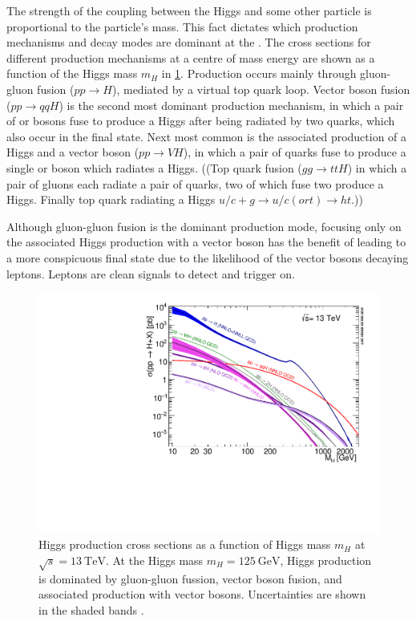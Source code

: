 The strength of the coupling between the Higgs and some other particle is proportional to the particle's mass.
This fact dictates which production mechanisms and decay modes are dominant at the \LHC.
The cross sections for different production mechanisms at a centre of mass energy  are shown as a function of the Higgs mass $m_H$ in \cref{fig:higgs_production_xs}.
Production occurs mainly through gluon-gluon fusion ($pp \rightarrow H$), mediated by a virtual top quark loop. 
Vector boson fusion ($pp \rightarrow qqH$) is the second most dominant production mechanism, in which a pair of \Wboson or \Zboson bosons fuse to produce a Higgs after being radiated by two quarks, which also occur in the final state.
Next most common is the associated production of a Higgs and a vector boson ($pp \rightarrow VH$), in which a pair of quarks fuse to produce a single \Wboson or \Zboson boson which radiates a Higgs.
((Top quark fusion ($gg \rightarrow ttH$) in which a pair of gluons each radiate a pair of quarks, two of which fuse  two produce a Higgs.
Finally top quark radiating a Higgs $u/c + g \rightarrow u/c (or t) \rightarrow ht$.))

Although gluon-gluon fusion is the dominant production mode, focusing only on the associated Higgs production with a vector boson has the benefit of leading to a more conspicuous final state due to the likelihood of the vector bosons decaying leptons.
Leptons are clean signals to detect and trigger on.

\begin{figure}[!htbp]
  \centering
  \includegraphics[width=0.7\linewidth]{chapters/1.theory/figs/plotAll_13tev_BSM_sqrt.pdf}
  \caption{Higgs production cross sections as a function of Higgs mass $m_H$ at $\sqrt{s} = \SI{13}{\TeV}$. At the Higgs mass $m_H = \SI{125}{\GeV}$, Higgs production is dominated by gluon-gluon fussion, vector boson fusion, and associated production with vector bosons. Uncertainties are shown in the shaded bands \cite{deFlorian:2016spz}.}
  \label{fig:higgs_production_xs}
\end{figure}


